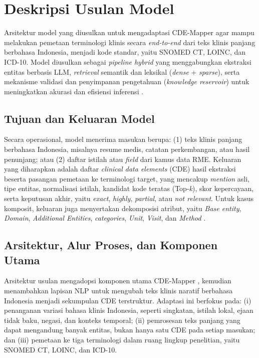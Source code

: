 \section{Deskripsi Usulan Model}

Arsitektur model yang diusulkan untuk mengadaptasi CDE-Mapper agar mampu melakukan pemetaan terminologi klinis secara \textit{end-to-end} dari teks klinis panjang berbahasa Indonesia, menjadi kode standar, yaitu SNOMED CT, LOINC, dan ICD-10. Model diusulkan sebagai \textit{pipeline hybrid} yang menggabungkan ekstraksi entitas berbasis LLM, \textit{retrieval} semantik dan leksikal (\textit{dense} + \textit{sparse}), serta mekanisme validasi dan penyimpanan pengetahuan (\textit{knowledge reservoir}) untuk meningkatkan akurasi dan efisiensi inferensi \citep{gilani_cde-mapper_2025}.

\subsection{Tujuan dan Keluaran Model}

Secara operasional, model menerima masukan berupa: (1) teks klinis panjang berbahasa Indonesia, misalnya resume medis, catatan perkembangan, atau hasil penunjang; atau (2) daftar istilah atau \textit{field} dari kamus data RME. Keluaran yang diharapkan adalah daftar \textit{clinical data elements} (CDE) hasil ekstraksi beserta pasangan pemetaan ke terminologi target, yang mencakup \textit{mention} asli, tipe entitas, normalisasi istilah, kandidat kode teratas (Top-\textit{k}), skor kepercayaan, serta keputusan akhir, yaitu \textit{exact}, \textit{highly}, \textit{partial}, atau \textit{not relevant}. Untuk kasus komposit, keluaran juga menyertakan dekomposisi atribut, yaitu \textit{Base entity}, \textit{Domain}, \textit{Additional Entities}, \textit{categories}, \textit{Unit}, \textit{Visit}, dan \textit{Method} \citep{gilani_cde-mapper_2025}.


\subsection{Arsitektur, Alur Proses, dan Komponen Utama}

Arsitektur usulan mengadopsi komponen utama CDE-Mapper \citep{gilani_cde-mapper_2025}, kemudian menambahkan lapisan NLP untuk mengubah teks klinis naratif berbahasa Indonesia menjadi sekumpulan CDE terstruktur. Adaptasi ini berfokus pada: (i) penanganan variasi bahasa klinis Indonesia, seperti singkatan, istilah lokal, ejaan tidak baku, negasi, dan konteks temporal; (ii) pemrosesan teks panjang yang dapat mengandung banyak entitas, bukan hanya satu CDE pada setiap masukan; dan (iii) pemetaan ke tiga terminologi dalam ruang lingkup penelitian, yaitu SNOMED CT, LOINC, dan ICD-10.

